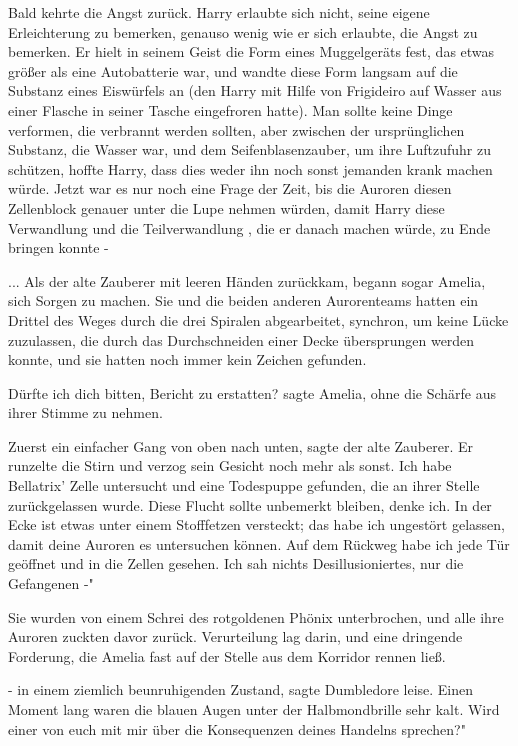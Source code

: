 Bald kehrte die Angst zurück. Harry erlaubte sich nicht, seine eigene
Erleichterung zu bemerken, genauso wenig wie er sich erlaubte, die Angst zu
bemerken. Er hielt in seinem Geist die Form eines Muggelgeräts fest, das etwas
größer als eine Autobatterie war, und wandte diese Form langsam auf die Substanz
eines Eiswürfels an (den Harry mit Hilfe von Frigideiro auf Wasser aus einer
Flasche in seiner Tasche eingefroren hatte). Man sollte keine Dinge verformen,
die verbrannt werden sollten, aber zwischen der ursprünglichen Substanz, die
Wasser war, und dem Seifenblasenzauber, um ihre Luftzufuhr zu schützen, hoffte
Harry, dass dies weder ihn noch sonst jemanden krank machen würde. Jetzt war es
nur noch eine Frage der Zeit, bis die Auroren diesen Zellenblock genauer unter
die Lupe nehmen würden, damit Harry diese Verwandlung und die Teilverwandlung ,
die er danach machen würde, zu Ende bringen konnte -

... Als der alte Zauberer mit leeren Händen zurückkam, begann sogar Amelia, sich
Sorgen zu machen. Sie und die beiden anderen Aurorenteams hatten ein Drittel des
Weges durch die drei Spiralen abgearbeitet, synchron, um keine Lücke zuzulassen,
die durch das Durchschneiden einer Decke übersprungen werden konnte, und sie
hatten noch immer kein Zeichen gefunden.

\glqq{}Dürfte ich dich bitten, Bericht zu erstatten?\grqq{} sagte Amelia, ohne
die Schärfe aus ihrer Stimme zu nehmen.

\glqq{}Zuerst ein einfacher Gang von oben nach unten\grqq{}, sagte der alte
Zauberer. Er runzelte die Stirn und verzog sein Gesicht noch mehr als sonst.
\glqq{}Ich habe Bellatrix' Zelle untersucht und eine Todespuppe gefunden, die an
ihrer Stelle zurückgelassen wurde. Diese Flucht sollte unbemerkt bleiben, denke
ich. In der Ecke ist etwas unter einem Stofffetzen versteckt; das habe ich
ungestört gelassen, damit deine Auroren es untersuchen können. Auf dem Rückweg
habe ich jede Tür geöffnet und in die Zellen gesehen. Ich sah nichts
Desillusioniertes, nur die Gefangenen -"

Sie wurden von einem Schrei des rotgoldenen Phönix unterbrochen, und alle ihre
Auroren zuckten davor zurück. Verurteilung lag darin, und eine dringende
Forderung, die Amelia fast auf der Stelle aus dem Korridor rennen ließ.

\glqq{}- in einem ziemlich beunruhigenden Zustand\grqq{}, sagte Dumbledore leise.
Einen Moment lang waren die blauen Augen unter der Halbmondbrille sehr kalt.
\glqq{}Wird einer von euch mit mir über die Konsequenzen deines Handelns
sprechen?"


